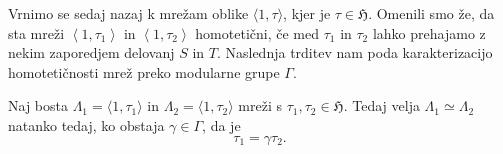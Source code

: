 \documentclass[mat1]{fmfdelo}
\numberwithin{equation}{section}
\newcommand{\HH}{\mathfrak{H}}
\newcommand{\SL}{\Gamma}
\newcommand{\htp}{\simeq}
\newcommand{\lattice}[2]{\left\langle #1, #2 \right\rangle}
\theoremstyle{definition}
\begin{document}
Vrnimo se sedaj nazaj k mrežam oblike $\langle 1, \tau \rangle$, kjer je $\tau \in \HH$. Omenili smo že, da sta mreži $\lattice{1}{\tau_1}$ in $\lattice{1}{\tau_2}$ homotetični, če med $\tau_1$ in $\tau_2$ lahko prehajamo z nekim zaporedjem delovanj $S$ in $T$. Naslednja trditev nam poda karakterizacijo homotetičnosti mrež preko modularne grupe $\SL$.




\begin{trditev}
    \label{ekvivalentne normalizirane mreze}
    Naj bosta $\Lambda_1 = \langle 1, \tau_1 \rangle$ in $\Lambda_2 = \langle 1, \tau_2 \rangle$ mreži s $\tau_1, \tau_2 \in \HH$. Tedaj velja $\Lambda_1 \htp \Lambda_2$ natanko tedaj, ko obstaja $\gamma \in \SL$,  da je 
    \[
        \tau_1 = \gamma\tau_2.
    \]
\end{trditev}
\end{document}
